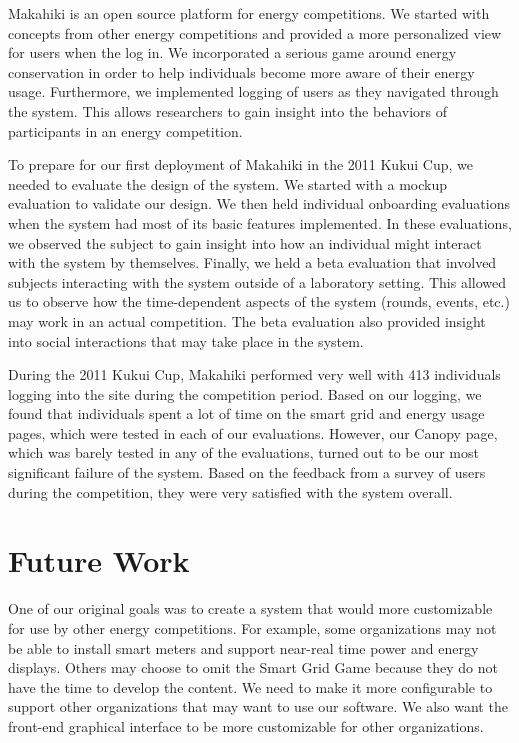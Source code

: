 Makahiki is an open source platform for energy competitions. We started with concepts from other energy competitions and provided a more personalized view for users when the log in. We incorporated a serious game around energy conservation in order to help individuals become more aware of their energy usage. Furthermore, we implemented logging of users as they navigated through the system. This allows researchers to gain insight into the behaviors of participants in an energy competition.

To prepare for our first deployment of Makahiki in the 2011 Kukui Cup, we needed to evaluate the design of the system. We started with a mockup evaluation to validate our design. We then held individual onboarding evaluations when the system had most of its basic features implemented. In these evaluations, we observed the subject to gain insight into how an individual might interact with the system by themselves. Finally, we held a beta evaluation that involved subjects interacting with the system outside of a laboratory setting. This allowed us to observe how the time-dependent aspects of the system (rounds, events, etc.) may work in an actual competition. The beta evaluation also provided insight into social interactions that may take place in the system.

During the 2011 Kukui Cup, Makahiki performed very well with 413 individuals logging into the site during the competition period. Based on our logging, we found that individuals spent a lot of time on the smart grid and energy usage pages, which were tested in each of our evaluations. However, our Canopy page, which was barely tested in any of the evaluations, turned out to be our most significant failure of the system. Based on the feedback from a survey of users during the competition, they were very satisfied with the system overall.

\section{Future Work}
\label{future-work}

One of our original goals was to create a system that would more customizable for use by other energy competitions. For example, some organizations may not be able to install smart meters and support near-real time power and energy displays. Others may choose to omit the Smart Grid Game because they do not have the time to develop the content. We need to make it more configurable to support other organizations that may want to use our software. We also want the front-end graphical interface to be more customizable for other organizations.

